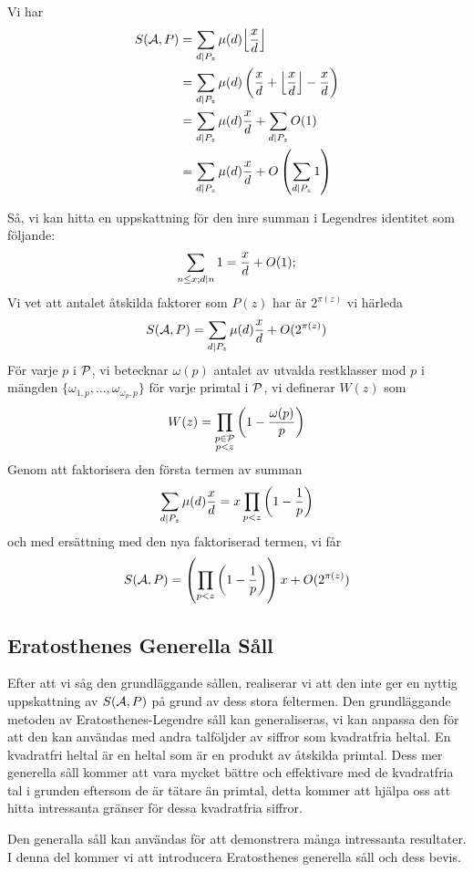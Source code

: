 Vi har
\begin{align*}
S(\A, P) & =\sum_{d\divides P_z}\mu(d)\Bigl\lfloor \frac{x}{d}\Bigr\rfloor\\
 &  =\sum_{d\divides P_z}\mu(d) \left( \frac{x}{d}+ \Bigl\lfloor \frac{x}{d} \Bigr\rfloor - \frac{x}{d} \right)\\
 & =\sum_{d\divides P_z}\mu(d)\frac{x}{d}+\sum_{d\divides P_z}O(1)\\
 & =\sum_{d\divides P_z}\mu(d)\frac{x}{d}+ O\left(\sum_{d\divides P_z}1\right)
\end{align*}

Så, vi kan hitta en uppskattning för den inre summan i Legendres identitet som följande:
\[\sum_{n\leq x;d\divides n}1=\frac{x}{d}+O(1); \]
Vi vet att antalet åtskilda faktorer som $ P(z) $ har är $ 2^{\pi(z)} $ vi härleda
\[S(\A, P)=\sum_{d\divides P_z}\mu(d)\frac{x}{d}+ O(2^{\pi(z)}) \]
För varje $ p $ i $ \P $, vi betecknar $ \omega(p) $ antalet av utvalda restklasser mod $ p $ i mängden $ \lbrace \omega_{1,p},...,\omega_{\omega_{p},p}\rbrace $ för varje primtal i $ \P $, vi definerar $ W(z) $ som
\[W(z)=\prod_{\substack{p\in \P\\p<z}}\left( 1-\frac{\omega(p)}{p}\right)\]
Genom att faktorisera den första termen av summan 
\[\sum_{d\divides P_z}\mu(d)\frac{x}{d}= x\prod_{p< z}\left( 1-\frac{1}{p} \right) \]
och med ersättning med den nya faktoriserad termen, vi får
\[S(\A, P)=\left( \prod_{p< z}\left( 1-\frac{1}{p} \right)\right) x +O(2^{\pi(z)}) \]




\subsection{Eratosthenes Generella Såll}
Efter att vi såg den grundläggande sållen, realiserar vi att den inte ger en nyttig uppskattning av $ S(\A, P) $ på grund av dess stora feltermen. Den grundläggande metoden av Eratosthenes-Legendre såll kan generaliseras, vi kan anpassa den för att den kan användas med andra talföljder av siffror som kvadratfria heltal. En kvadratfri heltal är en heltal som är en produkt av åtskilda primtal. Dess mer generella såll kommer att vara mycket bättre och effektivare med de kvadratfria tal i grunden eftersom de är tätare än primtal, detta kommer att hjälpa oss att hitta intressanta gränser för dessa kvadratfria siffror.

Den generalla såll kan användas för att demonstrera många intressanta resultater. I denna del kommer vi att introducera Eratosthenes generella såll och dess bevis.

